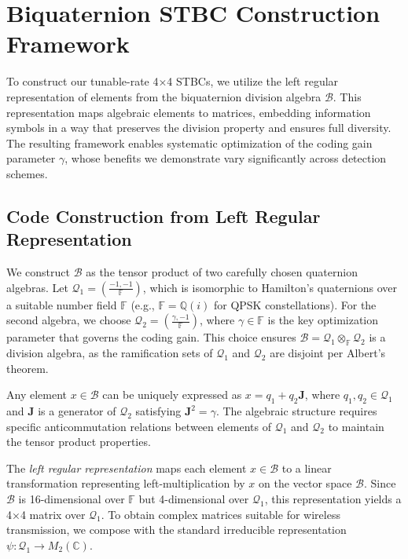 \documentclass[twocolumn,conference]{IEEEtran}
\begin{document}
\section{Biquaternion STBC Construction Framework}
To construct our tunable-rate 4×4 STBCs, we utilize the left regular representation of elements from the biquaternion division algebra $\mathcal{B}$. This representation maps algebraic elements to matrices, embedding information symbols in a way that preserves the division property and ensures full diversity. The resulting framework enables systematic optimization of the coding gain parameter $\gamma$, whose benefits we demonstrate vary significantly across detection schemes.

\subsection{Code Construction from Left Regular Representation}

We construct $\mathcal{B}$ as the tensor product of two carefully chosen quaternion algebras. Let $\mathcal{Q}_1 = \left(\frac{-1,-1}{\mathbb{F}}\right)$, which is isomorphic to Hamilton's quaternions over a suitable number field $\mathbb{F}$ (e.g., $\mathbb{F} = \mathbb{Q}(i)$ for QPSK constellations). For the second algebra, we choose $\mathcal{Q}_2 = \left(\frac{\gamma,-1}{\mathbb{F}}\right)$, where $\gamma \in \mathbb{F}$ is the key optimization parameter that governs the coding gain. This choice ensures $\mathcal{B} = \mathcal{Q}_1 \otimes_{\mathbb{F}} \mathcal{Q}_2$ is a division algebra, as the ramification sets of $\mathcal{Q}_1$ and $\mathcal{Q}_2$ are disjoint per Albert's theorem.

Any element $x \in \mathcal{B}$ can be uniquely expressed as $x = q_1 + q_2 \mathbf{J}$, where $q_1, q_2 \in \mathcal{Q}_1$ and $\mathbf{J}$ is a generator of $\mathcal{Q}_2$ satisfying $\mathbf{J}^2 = \gamma$. The algebraic structure requires specific anticommutation relations between elements of $\mathcal{Q}_1$ and $\mathcal{Q}_2$ to maintain the tensor product properties.

The \emph{left regular representation} maps each element $x \in \mathcal{B}$ to a linear transformation representing left-multiplication by $x$ on the vector space $\mathcal{B}$. Since $\mathcal{B}$ is 16-dimensional over $\mathbb{F}$ but 4-dimensional over $\mathcal{Q}_1$, this representation yields a 4×4 matrix over $\mathcal{Q}_1$. To obtain complex matrices suitable for wireless transmission, we compose with the standard irreducible representation $\psi: \mathcal{Q}_1 \to M_2(\mathbb{C})$.
\end{document}
